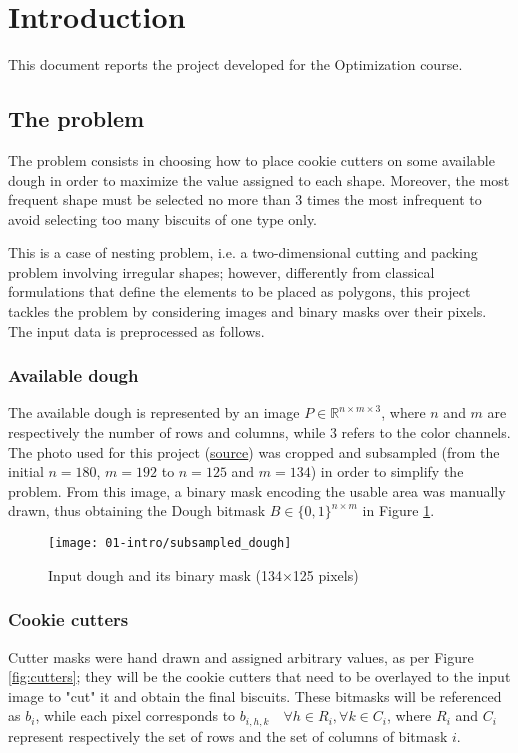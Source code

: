 
\section{Introduction}
This document reports the project developed for the Optimization course.

\subsection{The problem}
The problem consists in choosing how to place cookie cutters on some available dough in order to maximize the value assigned to each shape. Moreover, the most frequent shape must be selected no more than 3 times the most infrequent to avoid selecting too many biscuits of one type only.

This is a case of nesting problem, i.e. a two-dimensional cutting and packing problem involving irregular shapes; however, differently from classical formulations that define the elements to be placed as polygons, this project tackles the problem by considering images and binary masks over their pixels. The input data is preprocessed as follows.

\subsubsection{Available dough}
The available dough is represented by an image $P \in \mathbb{R}^{n \times m \times 3}$, where $n$ and $m$ are respectively the number of rows and columns, while $3$ refers to the color channels. The photo used for this project (\href{https://www.buttalapasta.it/ricette/ricetta-biscotti-al-latte/25247/}{source}) was cropped and subsampled (from the initial $n=180$, $m=192$ to $n=125$ and $m=134$) in order to simplify the problem. From this image, a binary mask encoding the usable area was manually drawn, thus obtaining the Dough bitmask $B \in \{0, 1\}^{n \times m}$ in Figure \ref{fig:input_dough}.

\begin{figure}[H]
	\centering	
	\texttt{[image: 01-intro/subsampled\_dough]}
	\caption{Input dough and its binary mask (134×125 pixels)}
	\label{fig:input_dough}
\end{figure}

\subsubsection{Cookie cutters}
Cutter masks were hand drawn and assigned arbitrary values, as per Figure \ref{fig:cutters}; they will be the cookie cutters that need to be overlayed to the input image to "cut" it and obtain the final biscuits. These bitmasks will be referenced as $b_i$, while each pixel corresponds to $b_{i, h, k} \quad \forall h \in R_i, \forall k \in C_i$, where $R_i$ and $C_i$ represent respectively the set of rows and the set of columns of bitmask $i$.


